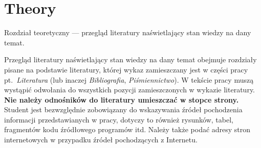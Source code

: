 
\chapter{Theory}

Rozdział teoretyczny --- przegląd literatury naświetlający stan wiedzy na dany temat. 

Przegląd literatury naświetlający stan wiedzy na dany temat obejmuje rozdziały pisane na podstawie
literatury, której wykaz zamieszczany jest w części pracy pt.~\emph{Literatura} (lub inaczej \emph{Bibliografia},
\emph{Piśmiennictwo}). W tekście pracy muszą wystąpić odwołania do wszystkich pozycji zamieszczonych w
wykazie literatury. \textbf{Nie należy odnośników do literatury umieszczać w stopce strony.} Student jest
bezwzględnie zobowiązany do wskazywania źródeł pochodzenia informacji przedstawianych w pracy,
dotyczy to również rysunków, tabel, fragmentów kodu źródłowego programów itd. Należy także podać
adresy stron internetowych w przypadku źródeł pochodzących z Internetu.


